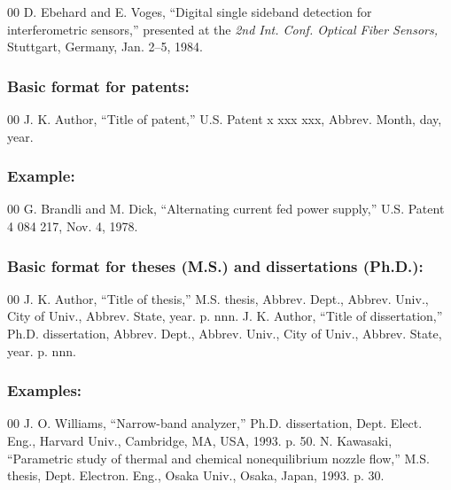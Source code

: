 \begin{thebibliography}{00}
 D. Ebehard and E. Voges, ``Digital single sideband
detection for interferometric sensors,'' presented at the \textit{2nd Int. Conf. Optical Fiber Sensors,} Stuttgart, Germany, Jan. 2--5, 1984.
\end{thebibliography}

\subsubsection*{Basic format for patents:}

\begin{thebibliography}{00}
 J. K. Author, ``Title of patent,'' U.S. Patent {x xxx xxx}, Abbrev. Month, day, year.
\end{thebibliography}

\subsubsection*{Example:}

\begin{thebibliography}{00}
 G. Brandli and M. Dick, ``Alternating current fed power supply,'' U.S. Patent 4 084 217, Nov. 4, 1978.
\end{thebibliography}

\subsubsection*{Basic format for theses (M.S.) and dissertations (Ph.D.):}

\begin{thebibliography}{00}
 J. K. Author, ``Title of thesis,'' M.S. thesis, Abbrev. Dept., Abbrev.
Univ., City of Univ., Abbrev. State, year. p. nnn.
 J. K. Author, ``Title of dissertation,'' Ph.D. dissertation, Abbrev.
Dept., Abbrev. Univ., City of Univ., Abbrev. State, year. p. nnn.
\end{thebibliography}

\subsubsection*{Examples:}

\begin{thebibliography}{00}
 J. O. Williams, ``Narrow-band analyzer,'' Ph.D. dissertation, Dept. Elect. Eng., Harvard Univ., Cambridge, MA, USA, 1993. p. 50.
 N. Kawasaki, ``Parametric study of thermal and chemical nonequilibrium nozzle flow,'' M.S. thesis, Dept. Electron. Eng., Osaka Univ., Osaka, Japan, 1993. p. 30.
\end{thebibliography}

